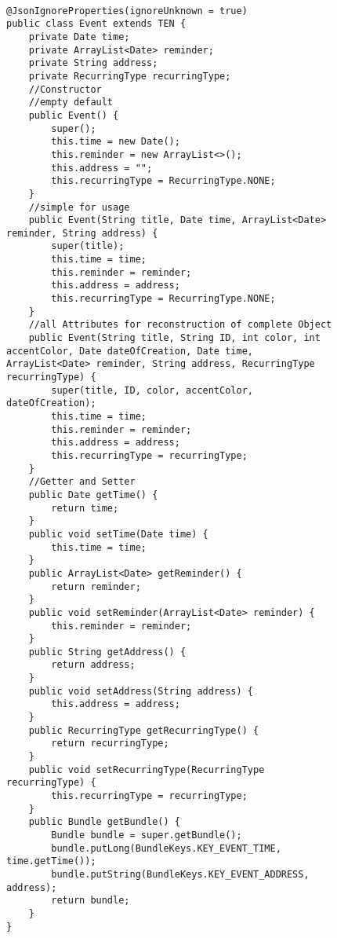 \begin{figure}[H]
\begin{lstlisting}[caption=Event (Joscha Nassenstein)]

@JsonIgnoreProperties(ignoreUnknown = true)
public class Event extends TEN {
    private Date time;
    private ArrayList<Date> reminder;
    private String address;
    private RecurringType recurringType;
    //Constructor
    //empty default
    public Event() {
        super();
        this.time = new Date();
        this.reminder = new ArrayList<>();
        this.address = "";
        this.recurringType = RecurringType.NONE;
    }
    //simple for usage
    public Event(String title, Date time, ArrayList<Date> reminder, String address) {
        super(title);
        this.time = time;
        this.reminder = reminder;
        this.address = address;
        this.recurringType = RecurringType.NONE;
    }
    //all Attributes for reconstruction of complete Object
    public Event(String title, String ID, int color, int accentColor, Date dateOfCreation, Date time, ArrayList<Date> reminder, String address, RecurringType recurringType) {
        super(title, ID, color, accentColor, dateOfCreation);
        this.time = time;
        this.reminder = reminder;
        this.address = address;
        this.recurringType = recurringType;
    }
    //Getter and Setter
    public Date getTime() {
        return time;
    }
    public void setTime(Date time) {
        this.time = time;
    }
    public ArrayList<Date> getReminder() {
        return reminder;
    }
    public void setReminder(ArrayList<Date> reminder) {
        this.reminder = reminder;
    }
    public String getAddress() {
        return address;
    }
    public void setAddress(String address) {
        this.address = address;
    }
    public RecurringType getRecurringType() {
        return recurringType;
    }
    public void setRecurringType(RecurringType recurringType) {
        this.recurringType = recurringType;
    }
    public Bundle getBundle() {
        Bundle bundle = super.getBundle();
        bundle.putLong(BundleKeys.KEY_EVENT_TIME, time.getTime());
        bundle.putString(BundleKeys.KEY_EVENT_ADDRESS, address);
        return bundle;
    }
}
\end{lstlisting}
\end{figure}

